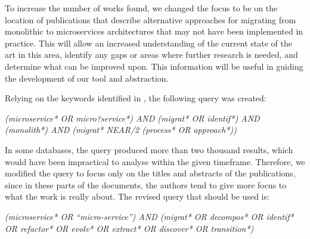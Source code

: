 To increase the number of works found, we changed the focus to be on the
location of publications that describe alternative approaches for migrating
from monolithic to microservices architectures that may not have been
implemented in practice. This will allow an increased understanding of the
current state of the art in this area, identify any gaps or areas where further
research is needed, and determine what can be improved upon. This information
will be useful in guiding the development of our tool and abstraction.

Relying on the keywords identified in , the following query
was created:

\begin{center}
  \emph{(microservice* OR micro?service*) AND (migrat* OR identif*) AND
  (monolith*) AND (migrat* NEAR/2 (process* OR approach*))}
\end{center}

In some databases, the query produced more than two thousand results, which
would have been impractical to analyse within the given timeframe. Therefore,
we modified the query to focus only on the titles and abstracts of the
publications, since in these parts of the documents, the authors tend to give
more focus to what the work is really about. The revised query that should be
used is:

\begin{center}
  \emph{(microservice* OR ``micro-service'') AND (migrat* OR decompos* OR
  identif* OR refactor* OR evolv* OR extract* OR discover* OR transition*)}
\end{center}
